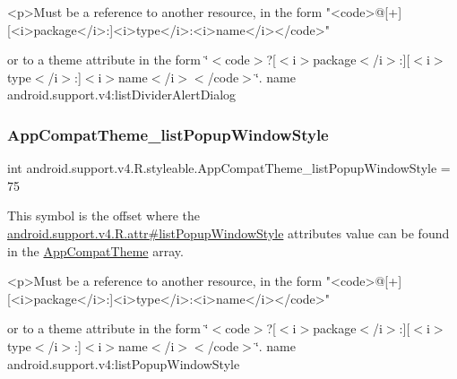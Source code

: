 \begin{DoxyVerb}      <p>Must be a reference to another resource, in the form "<code>@[+][<i>package</i>:]<i>type</i>:<i>name</i></code>"
\end{DoxyVerb}
 or to a theme attribute in the form \char`\"{}$<$code$>$?\mbox{[}$<$i$>$package$<$/i$>$\+:\mbox{]}\mbox{[}$<$i$>$type$<$/i$>$\+:\mbox{]}$<$i$>$name$<$/i$>$$<$/code$>$\char`\"{}.  name android.\+support.\+v4\+:list\+Divider\+Alert\+Dialog \mbox{\label{classandroid_1_1support_1_1v4_1_1R_1_1styleable_ae7d26e004b40152e1dfd2b283043a64f}} 
\subsubsection{\texorpdfstring{App\+Compat\+Theme\+\_\+list\+Popup\+Window\+Style}{AppCompatTheme\_listPopupWindowStyle}}
{\footnotesize\ttfamily int android.\+support.\+v4.\+R.\+styleable.\+App\+Compat\+Theme\+\_\+list\+Popup\+Window\+Style = 75\hspace{0.3cm}{\ttfamily [static]}}

This symbol is the offset where the \hyperlink{classandroid_1_1support_1_1v4_1_1R_1_1attr_a88bbcdcadb337104abf92ae2375b91a4}{android.\+support.\+v4.\+R.\+attr\#list\+Popup\+Window\+Style} attribute\textquotesingle{}s value can be found in the \hyperlink{classandroid_1_1support_1_1v4_1_1R_1_1styleable_ac07ebbe62ed977f6dcaadc6397840ace}{App\+Compat\+Theme} array.

\begin{DoxyVerb}      <p>Must be a reference to another resource, in the form "<code>@[+][<i>package</i>:]<i>type</i>:<i>name</i></code>"
\end{DoxyVerb}
 or to a theme attribute in the form \char`\"{}$<$code$>$?\mbox{[}$<$i$>$package$<$/i$>$\+:\mbox{]}\mbox{[}$<$i$>$type$<$/i$>$\+:\mbox{]}$<$i$>$name$<$/i$>$$<$/code$>$\char`\"{}.  name android.\+support.\+v4\+:list\+Popup\+Window\+Style \mbox{\label{classandroid_1_1support_1_1v4_1_1R_1_1styleable_a9b71c2c15e2b7ab9c0f8f48771d4444e}} 
